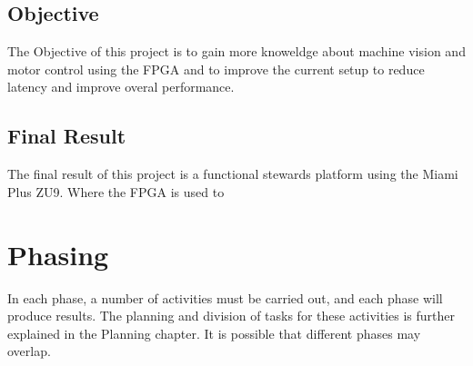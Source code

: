 \documentclass{article}
\begin{document}
\subsection{Objective}
The Objective of this project is to gain more knoweldge about machine vision and motor control using the FPGA 
and to improve the current setup to reduce latency and improve overal performance.
\subsection{Final Result}
The final result of this project is a functional stewards platform using the Miami Plus ZU9.
Where the FPGA is used to 

\newpage
\section{Phasing}
In each phase, a number of activities must be carried out, and each phase will produce results.
The planning and division of tasks for these activities is further explained in the Planning chapter.
It is possible that different phases may overlap.

%
\end{document}
